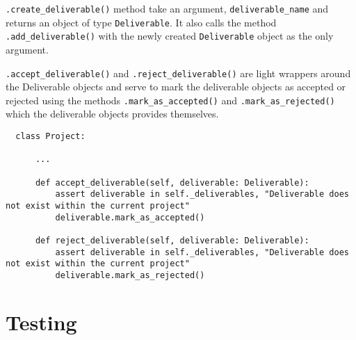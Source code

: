 \verb+.create_deliverable()+ method take an argument, \verb+deliverable_name+ and returns an object of type \verb+Deliverable+. It also calls the method \verb+.add_deliverable()+ with the newly created \verb+Deliverable+ object as the only argument.

\verb+.accept_deliverable()+ and \verb+.reject_deliverable()+ are light wrappers around the Deliverable objects and serve to mark the deliverable objects as accepted or rejected using the methods \verb+.mark_as_accepted()+ and \verb+.mark_as_rejected()+ which the deliverable objects provides themselves.

\begin{lstlisting}
  class Project:

      ...

      def accept_deliverable(self, deliverable: Deliverable):
          assert deliverable in self._deliverables, "Deliverable does not exist within the current project"
          deliverable.mark_as_accepted()

      def reject_deliverable(self, deliverable: Deliverable):
          assert deliverable in self._deliverables, "Deliverable does not exist within the current project"
          deliverable.mark_as_rejected()
\end{lstlisting}


\section{Testing}
